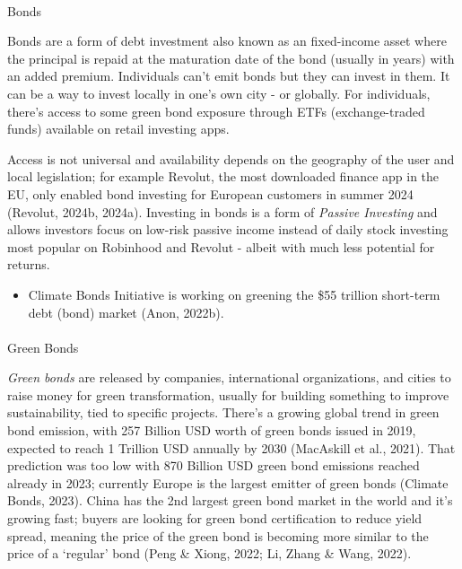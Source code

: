\documentclass[
  letterpaper,
  DIV=11,
  numbers=noendperiod]{scrartcl}
\makeatletter
\let\oldparagraph\paragraph
\renewcommand{\paragraph}{
    \@ifstar
      \xxxParagraphStar
      \xxxParagraphNoStar
  }
\newcommand{\xxxParagraphStar}[1]{\oldparagraph*{#1}\mbox{}}
\newcommand{\xxxParagraphNoStar}[1]{\oldparagraph{#1}\mbox{}}
\providecommand{\tightlist}{%
  \setlength{\itemsep}{0pt}\setlength{\parskip}{0pt}}\usepackage{longtable,booktabs,array}
\makeatother
\begin{document}
\paragraph{Bonds}\label{bonds}

Bonds are a form of debt investment also known as an fixed-income asset
where the principal is repaid at the maturation date of the bond
(usually in years) with an added premium. Individuals can't emit bonds
but they can invest in them. It can be a way to invest locally in one's
own city - or globally. For individuals, there's access to some green
bond exposure through ETFs (exchange-traded funds) available on retail
investing apps.

Access is not universal and availability depends on the geography of the
user and local legislation; for example Revolut, the most downloaded
finance app in the EU, only enabled bond investing for European
customers in summer 2024 (Revolut, 2024b, 2024a). Investing in bonds is
a form of \emph{Passive Investing} and allows investors focus on
low-risk passive income instead of daily stock investing most popular on
Robinhood and Revolut - albeit with much less potential for returns.

\begin{itemize}
\tightlist
\item
  Climate Bonds Initiative is working on greening the \$55 trillion
  short-term debt (bond) market (Anon, 2022b).
\end{itemize}

\paragraph{Green Bonds}\label{green-bonds}

\emph{Green bonds} are released by companies, international
organizations, and cities to raise money for green transformation,
usually for building something to improve sustainability, tied to
specific projects. There's a growing global trend in green bond
emission, with 257 Billion USD worth of green bonds issued in 2019,
expected to reach 1 Trillion USD annually by 2030 (MacAskill et al.,
2021). That prediction was too low with 870 Billion USD green bond
emissions reached already in 2023; currently Europe is the largest
emitter of green bonds (Climate Bonds, 2023). China has the 2nd largest
green bond market in the world and it's growing fast; buyers are looking
for green bond certification to reduce yield spread, meaning the price
of the green bond is becoming more similar to the price of a `regular'
bond (Peng \& Xiong, 2022; Li, Zhang \& Wang, 2022).
\end{document}
